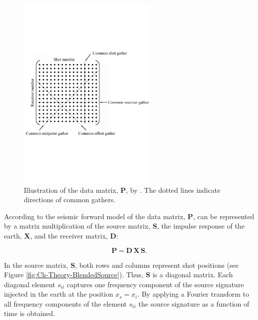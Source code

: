 \begin{figure}
    \centering
	\includegraphics[width = 0.6\textwidth]{Plots/Mahdad-Data-Matrix-edited}
	\caption{Illustration of the data matrix, $\mathbf{P}$, by \cite{Mahdad-Deblending-Method}. The dotted lines indicate directions of common gathers.}
	\label{fig:Ch-Theory-DataMatrixMahdad}
\end{figure}

According to the seismic forward model of \citet{Berkhout1982} the data matrix, $\mathbf{P}$, can be represented by a matrix multiplication of the source matrix, $\mathbf{S}$, the impulse response of the earth, $\mathbf{X}$, and the receiver matrix, $\mathbf{D}$:

\begin{equation}
	\mathbf{P} = \mathbf{D \, X \, S}.
	\label{eq:Ch-Theory-DataRepresentation}
\end{equation}

In the source matrix, $\mathbf{S}$, both rows and columns represent shot positions (see Figure \ref{fig:Ch-Theory-BlendedSource}). Thus, $\mathbf{S}$ is a diagonal matrix. Each diagonal element $s_{ii}$ captures one frequency component of the source signature injected in the earth at the position $x_s = x_i$. By applying a Fourier transform to all frequency components of the element $s_{ii}$ the source signature as a function of time is obtained.

